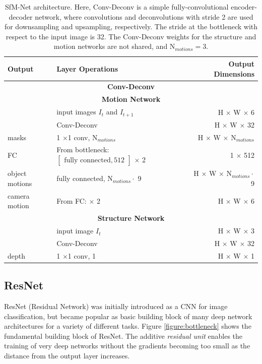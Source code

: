 {
\begin{table}[h]
\centering
\begin{tabular}{llr}
\toprule
\textbf{Output} & \textbf{Layer Operations} & \textbf{Output Dimensions} \\
\midrule\midrule
\multicolumn{3}{c}{\textbf{Conv-Deconv}}\\
\midrule
\multicolumn{3}{c}{\textbf{Motion Network}}\\
\midrule
 & input images $I_t$ and $I_{t+1}$ & H $\times$ W $\times$ 6 \\
 & Conv-Deconv & H $\times$ W $\times$ 32 \\
masks & 1 $\times$1 conv, N$_{motions}$ & H $\times$ W $\times$ N$_{motions}$ \\
FC & From bottleneck: $\begin{bmatrix}\textrm{fully connected}, 512\end{bmatrix}$ $\times$ 2 & 1 $\times$ 512 \\
object motions & fully connected, $\text{N}_{motions} \cdot$ 9 & H $\times$ W $\times$ $\text{N}_{motions} \cdot$ 9 \\
camera motion & From FC: $\times$ 2 & H $\times$ W $\times$ 6 \\
\midrule
\multicolumn{3}{c}{\textbf{Structure Network}}\\
\midrule
& input image $I_t$ & H $\times$ W $\times$ 3 \\
& Conv-Deconv & H $\times$ W $\times$ 32 \\
depth & 1 $\times$1 conv, 1  & H $\times$ W $\times$ 1 \\
\bottomrule


\end{tabular}

\caption {
SfM-Net \cite{SfmNet} architecture. Here, Conv-Deconv is a simple fully-convolutional
encoder-decoder network, where convolutions and deconvolutions with stride 2 are
used for downsampling and upsampling, respectively. The stride at the bottleneck
with respect to the input image is 32.
The Conv-Deconv weights for the structure and motion networks are not shared,
and N$_{motions} = 3$.
}
\label{table:sfmnet}
\end{table}
}

\subsection{ResNet}
\label{ssec:resnet}
ResNet (Residual Network) \cite{ResNet} was initially introduced as a CNN for image classification, but
became popular as basic building block of many deep network architectures for a variety
of different tasks. Figure \ref{figure:bottleneck}
shows the fundamental building block of ResNet. The additive \emph{residual unit} enables the training
of very deep networks without the gradients becoming too small as the distance
from the output layer increases.

